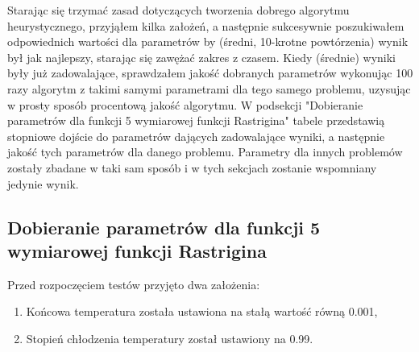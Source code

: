 \documentclass[twoside]{projektInzynierskiMS1}
\newcommand{\si}{ś}
\begin{document}
Starając się trzymać zasad dotyczących tworzenia dobrego algorytmu heurystycznego, przyjąłem kilka założeń, a następnie sukcesywnie poszukiwałem odpowiednich warto\si ci dla parametrów by (\si redni, 10-krotne powtórzenia) wynik był jak najlepszy, starając się zawężać zakres z czasem. Kiedy (\si rednie) wyniki były już zadowalające, sprawdzałem jako\si ć dobranych parametrów wykonując 100 razy algorytm z takimi samymi parametrami dla tego samego problemu, uzysując w prosty sposób procentową jako\si ć algorytmu. W podsekcji "Dobieranie parametrów dla funkcji 5 wymiarowej funkcji Rastrigina" tabele przedstawią stopniowe doj\si cie do parametrów dających zadowalające wyniki, a następnie jako\si ć tych parametrów dla danego problemu. Parametry dla innych problemów zostały zbadane w taki sam sposób i w tych sekcjach zostanie wspomniany jedynie wynik.

	\subsection{Dobieranie parametrów dla funkcji 5 wymiarowej funkcji Rastrigina}

Przed rozpoczęciem testów przyjęto dwa założenia:
\begin{enumerate}
	\item Końcowa temperatura została ustawiona na stałą warto\si ć równą 0.001,
	\item Stopień chłodzenia temperatury został ustawiony na 0.99.
\end{enumerate}

\renewcommand\arraystretch{1.333}
\end{document}
